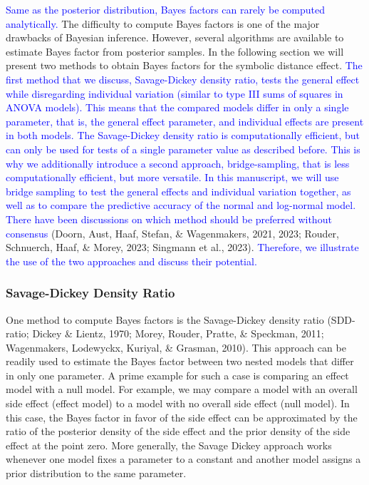 \documentclass[
  english,
  doc,floatsintext]{apa6}
\begin{document}
\textcolor{blue}{Same as the posterior distribution, Bayes factors can rarely be computed analytically.} The difficulty to compute Bayes factors is one of the major drawbacks of Bayesian inference. However, several algorithms are available to estimate Bayes factor from posterior samples. In the following section we will present two methods to obtain Bayes factors for the symbolic distance effect. \textcolor{blue}{The first method that we discuss, Savage-Dickey density ratio, tests the general effect while disregarding individual variation (similar to type III sums of squares in ANOVA models). This means that the compared models differ in only a single parameter, that is, the general effect parameter, and individual effects are present in both models. The Savage-Dickey density ratio is computationally efficient, but can only be used for tests of a single parameter value as described before. This is why we additionally introduce a second approach, bridge-sampling, that is less computationally efficient, but more versatile. In this manuscript, we will use bridge sampling to test the general effects and individual variation together, as well as to compare the predictive accuracy of the normal and log-normal model. There have been discussions on which method should be preferred without consensus} (Doorn, Aust, Haaf, Stefan, \& Wagenmakers, 2021, 2023; Rouder, Schnuerch, Haaf, \& Morey, 2023; Singmann et al., 2023). \textcolor{blue}{Therefore, we illustrate the use of the two approaches and discuss their potential.}

\hypertarget{savage-dickey-density-ratio}{%
\subsubsection{Savage-Dickey Density Ratio}\label{savage-dickey-density-ratio}}

One method to compute Bayes factors is the Savage-Dickey density ratio (SDD-ratio; Dickey \& Lientz, 1970; Morey, Rouder, Pratte, \& Speckman, 2011; Wagenmakers, Lodewyckx, Kuriyal, \& Grasman, 2010). This approach can be readily used to estimate the Bayes factor between two nested models that differ in only one parameter. A prime example for such a case is comparing an effect model with a null model. For example, we may compare a model with an overall side effect (effect model) to a model with no overall side effect (null model). In this case, the Bayes factor in favor of the side effect can be approximated by the ratio of the posterior density of the side effect and the prior density of the side effect at the point zero. More generally, the Savage Dickey approach works whenever one model fixes a parameter to a constant and another model assigns a prior distribution to the same parameter.
\end{document}
